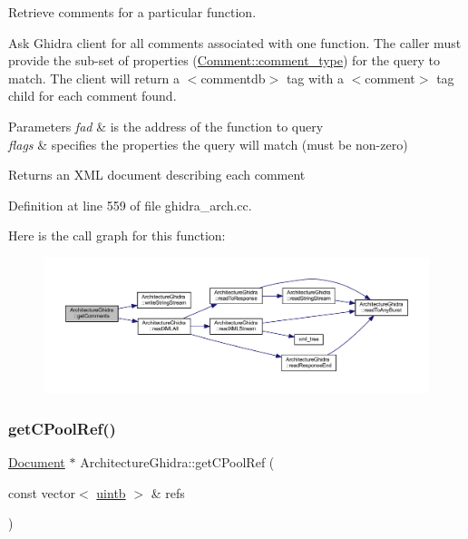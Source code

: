 Retrieve comments for a particular function. 

Ask Ghidra client for all comments associated with one function. The caller must provide the sub-\/set of properties (\mbox{\hyperlink{class_comment_a25e5457bf3deeb109bdef2f532317cf2}{Comment\+::comment\+\_\+type}}) for the query to match. The client will return a $<$commentdb$>$ tag with a $<$comment$>$ tag child for each comment found. 
\begin{DoxyParams}{Parameters}
{\em fad} & is the address of the function to query \\
\hline
{\em flags} & specifies the properties the query will match (must be non-\/zero) \\
\hline
\end{DoxyParams}
\begin{DoxyReturn}{Returns}
an X\+ML document describing each comment 
\end{DoxyReturn}


Definition at line 559 of file ghidra\+\_\+arch.\+cc.

Here is the call graph for this function\+:
\nopagebreak
\begin{figure}[H]
\begin{center}
\leavevmode
\includegraphics[width=350pt]{class_architecture_ghidra_adf2db85014f4129a11f6aadc3ac53776_cgraph}
\end{center}
\end{figure}
\mbox{\label{class_architecture_ghidra_a3806ce145501bdeb8dc6d60bad920d24}} 
\subsubsection{\texorpdfstring{getCPoolRef()}{getCPoolRef()}}
{\footnotesize\ttfamily \mbox{\hyperlink{class_document}{Document}} $\ast$ Architecture\+Ghidra\+::get\+C\+Pool\+Ref (\begin{DoxyParamCaption}\item[{const vector$<$ \mbox{\hyperlink{types_8h_a2db313c5d32a12b01d26ac9b3bca178f}{uintb}} $>$ \&}]{refs }\end{DoxyParamCaption})}



